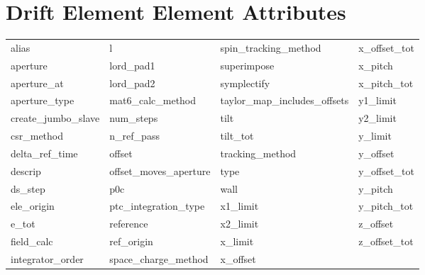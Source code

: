  \section{Drift Element Element Attributes}
 \label{s:list.drift}
 
 \begin{tabular}{llll} \toprule
alias                       & l                           & spin_tracking_method        & x_offset_tot                \\
aperture                    & lord_pad1                   & superimpose                 & x_pitch                     \\
aperture_at                 & lord_pad2                   & symplectify                 & x_pitch_tot                 \\
aperture_type               & mat6_calc_method            & taylor_map_includes_offsets & y1_limit                    \\
create_jumbo_slave          & num_steps                   & tilt                        & y2_limit                    \\
csr_method                  & n_ref_pass                  & tilt_tot                    & y_limit                     \\
delta_ref_time              & offset                      & tracking_method             & y_offset                    \\
descrip                     & offset_moves_aperture       & type                        & y_offset_tot                \\
ds_step                     & p0c                         & wall                        & y_pitch                     \\
ele_origin                  & ptc_integration_type        & x1_limit                    & y_pitch_tot                 \\
e_tot                       & reference                   & x2_limit                    & z_offset                    \\
field_calc                  & ref_origin                  & x_limit                     & z_offset_tot                \\
integrator_order            & space_charge_method         & x_offset                    &                             \\
 \bottomrule
 \end{tabular}
 \vfill
 
